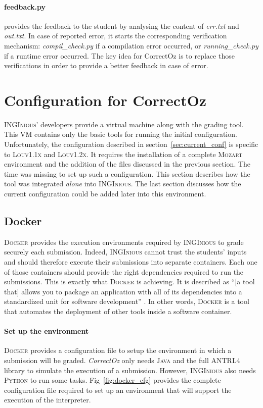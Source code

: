 \documentclass[11pt,a4paper,twoside,openright]{report}
\begin{document}
\paragraph{feedback.py} provides the feedback to the student by analysing the 
content of \textit{err.txt} and \textit{out.txt}. In case of reported
error, it starts the corresponding verification mechanism: 
\textit{compil\_check.py} if a compilation error occurred, or 
\textit{running\_check.py} if a runtime error occurred. The key idea for 
CorrectOz is to replace those verifications in order to provide a better 
feedback in case of error.

\section{Configuration for CorrectOz}

\textsc{INGInious}' developers provide a virtual machine along with the grading 
tool. This VM contains only the basic tools for running the initial 
configuration. Unfortunately, the configuration described in 
section~\ref{sec:current_conf} is specific to \textsc{Louv1.1x} and 
\textsc{Louv1.2x}. It requires the installation of a complete \textsc{Mozart} 
environment and the addition of the files discussed in the previous section. The 
time was missing to set up such a configuration. This section describes how the 
tool was integrated \textit{alone} into \textsc{INGInious}. The last section 
discusses how the current configuration could be added later into this 
environment.

\subsection{Docker}
\textsc{Docker} provides the execution environments required by 
\textsc{INGInious} to grade securely each submission. Indeed, \textsc{INGInious} 
cannot trust the students' inputs and should therefore execute their 
submissions into separate containers. Each one of those containers should 
provide the right dependencies required to run the submissions. This is exactly 
what \textsc{Docker} is achieving. It is described as \enquote{[a tool that] 
allows you to package an application with all of its dependencies into a 
standardized unit for software development} \cite{docker}. In other words, 
\textsc{Docker} is a tool that automates the deployment of other tools inside a 
software container.

\paragraph{Set up the environment} \textsc{Docker} provides a configuration file 
to setup the environment in which a submission will be graded.
\textit{CorrectOz} only needs \textsc{Java} and the full 
\textsc{ANTRL4} library to simulate the execution of a submission. However, 
\textsc{INGInious} also needs \textsc{Python} to run some tasks. 
Fig~\ref{fig:docker_cfg} provides the complete configuration file required to 
set up an environment that will support the execution of the interpreter.\\
\end{document}
